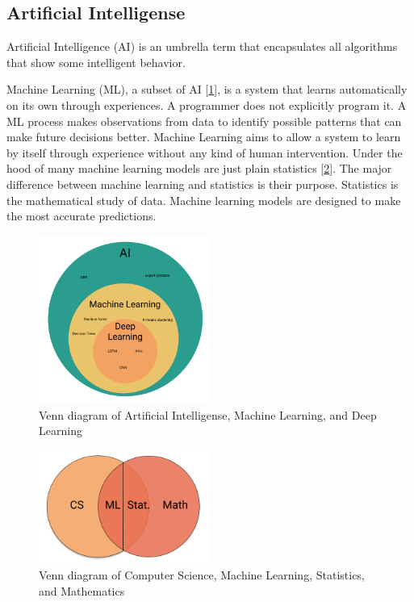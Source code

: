 \subsection{Artificial Intelligense}
Artificial Intelligence (AI) is an umbrella term that encapsulates all algorithms that
show some intelligent behavior.

Machine Learning (ML), a subset of AI [\cref{fig:venn-diagram-ml-deep-learning}], is a system that learns automatically on its own through experiences.
A programmer does not explicitly program it. A ML process makes observations from data to identify possible
patterns that can make future decisions better. Machine Learning aims to allow a system to learn by itself through
experience without any kind of human intervention. Under the hood of many machine learning models are just plain statistics [\cref{fig:venn-diagram-cs-ml-deep-learning}].
The major difference between machine learning and statistics is their purpose.
Statistics is the mathematical study of data.
Machine learning models are designed to make the most accurate predictions.


\begin{figure}[h!]
  \centering
  \includegraphics[width=0.5\textwidth]{./figs/illustrations/illustration_venn_diagram_ml_deep_learning.png}
  \hfill
  \caption{Venn diagram of Artificial Intelligense, Machine Learning, and Deep Learning}
  \label{fig:venn-diagram-ml-deep-learning}
\end{figure}
\begin{figure}[h!]
  \centering
  \includegraphics[width=0.5\textwidth]{./figs/illustrations/illustration_venn_diagram_cs_ml_stat_math.png}
  \hfill
  \caption{Venn diagram of Computer Science, Machine Learning, Statistics, and Mathematics}
  \label{fig:venn-diagram-cs-ml-deep-learning}
\end{figure}
